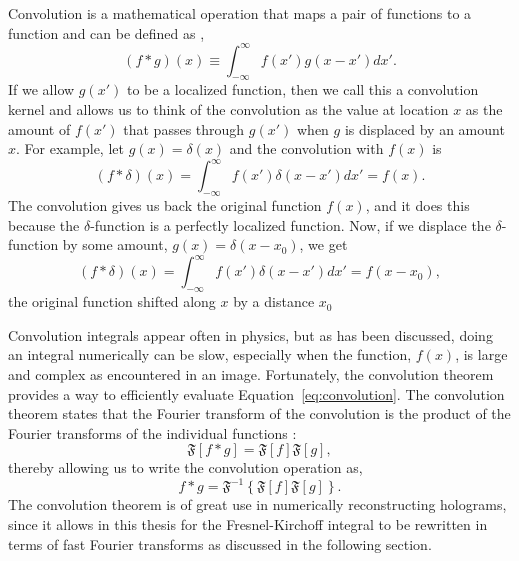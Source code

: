             Convolution is a mathematical operation that maps a pair of
            functions to a function and can be defined as \cite{DanielSteck},
            \begin{equation}
                (f*g)(x) \equiv \int_{-\infty}^{\infty} f(x')g(x-x')dx' .
                \label{eq:convolution}
            \end{equation}
            If we allow $g(x')$ to be a localized function, then we call this a
            convolution kernel and
            allows us to think of the convolution
            as the value at location $x$ as the amount of $f(x')$ that passes
            through $g(x')$ when $g$ is displaced by an amount $x$. For example,
            let $g(x) = \delta(x)$ and the convolution with $f(x)$ is
            \begin{equation}
                (f*\delta)(x)=\int_{-\infty}^{\infty}f(x')\delta(x-x')dx'=f(x).
            \end{equation}
            The convolution gives us back the original function $f(x)$, and it
            does this because the $\delta$-function is a perfectly localized
            function. Now, if we displace the $\delta$-function by some amount, $g(x)=\delta(x-x_0)$,
            we get
            \begin{equation}
                (f*\delta)(x)=\int_{-\infty}^{\infty}f(x')\delta(x-x')dx'=f(x-x_0),
            \end{equation}
            the original function shifted along $x$ by a distance $x_0$

            Convolution integrals appear often in physics, but as has been discussed, doing an
            integral numerically can be slow, especially when the function, $f(x)$,
            is large and complex as encountered in an image. 
            Fortunately, the convolution theorem provides a way to efficiently evaluate
            Equation~\ref{eq:convolution}. The convolution theorem states that the
            Fourier transform of the convolution is the product of the Fourier
            transforms of the individual functions \cite{DanielSteck}:
            \begin{equation}
                \mathfrak{F}\left[ f*g
                \right]=\mathfrak{F}[f]\mathfrak{F}[g] ,
            \end{equation}
            thereby allowing us to write the convolution operation as,
            \begin{equation}
                f*g = \mathfrak{F}^{-1}\left\{\mathfrak{F}[f]\mathfrak{F}[g]
            \right\}.
            \end{equation}
            The convolution theorem is of great use in numerically
            reconstructing holograms, since it allows in this thesis for the Fresnel-Kirchoff
            integral to be rewritten in terms of fast Fourier transforms as
            discussed in the following section.

